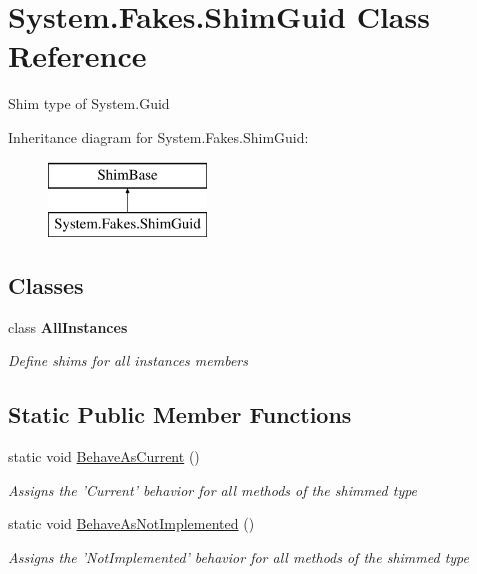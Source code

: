 \hypertarget{class_system_1_1_fakes_1_1_shim_guid}{\section{System.\-Fakes.\-Shim\-Guid Class Reference}
\label{class_system_1_1_fakes_1_1_shim_guid}
}


Shim type of System.\-Guid 


Inheritance diagram for System.\-Fakes.\-Shim\-Guid\-:\begin{figure}[H]
\begin{center}
\leavevmode
\includegraphics[height=2.000000cm]{class_system_1_1_fakes_1_1_shim_guid}
\end{center}
\end{figure}
\subsection*{Classes}
\begin{DoxyCompactItemize}
\item 
class {\bfseries All\-Instances}
\begin{DoxyCompactList}\small\item\em Define shims for all instances members\end{DoxyCompactList}\end{DoxyCompactItemize}
\subsection*{Static Public Member Functions}
\begin{DoxyCompactItemize}
\item 
static void \hyperlink{class_system_1_1_fakes_1_1_shim_guid_af03006e0958cd3be3793c2bed9113c13}{Behave\-As\-Current} ()
\begin{DoxyCompactList}\small\item\em Assigns the 'Current' behavior for all methods of the shimmed type\end{DoxyCompactList}\item 
static void \hyperlink{class_system_1_1_fakes_1_1_shim_guid_a0251e2065a173503c63c5092acf0fde4}{Behave\-As\-Not\-Implemented} ()
\begin{DoxyCompactList}\small\item\em Assigns the 'Not\-Implemented' behavior for all methods of the shimmed type\end{DoxyCompactList}\end{DoxyCompactItemize}
